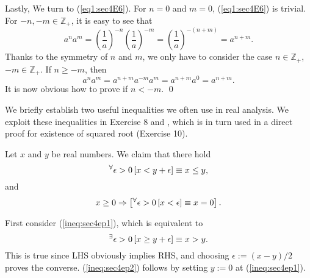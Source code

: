 \documentclass[a4paper,12pt]{article}
\begin{document}
\begin{sol}
	Lastly, We turn to (\ref{eq1:sec4E6}).
	For
	\( n=0 \)
	and
	\( m=0 \),
	(\ref{eq1:sec4E6})
	is trivial.
	For
	\( -n, -m \in \mathbb{Z}_{+} \),
	it is easy to see that
	\begin{equation*}
		a^n a^m
		=
		\left( \frac{1}{a} \right)^{-n} \left( \frac{1}{a} \right)^{-m}
		=
		\left( \frac{1}{a} \right)^{-(n+m)}
		=
		a^{n+m}.
	\end{equation*}
	Thanks to the symmetry of 
	\( n \)
	and
	\( m \),
	we only have to consider the case
	\( n \in \mathbb{Z}_{+} \),
	\( -m \in \mathbb{Z}_{+} \).
	If 
	\( n\ge -m \),
	then
	\begin{equation*}
		a^n a^m
		=
		a^{n+m}a^{-m}a^{m}
		=
		a^{n+m}a^{0}
		=
		a^{n+m}.
	\end{equation*}
	It is now obvious how to prove if
	\( n < -m \).
	\qed\end{sol}

We briefly establish two useful inequalities we often use in real analysis.
We exploit these inequalities in Exercise 8 and
,
which is in turn used in a direct proof for existence of squared root (Exercise 10).
\begin{lem}\label{lem:ineq_epsilon}
	Let \( x \) and \( y \) be real numbers.
	We claim that there hold
	\begin{equation}\label{ineq:sec4ep1}
		{}^{\forall}  \epsilon >0\left[ x< y+ \epsilon \right]
		\equiv
		x \le y,
	\end{equation}
	and 
	\begin{equation}\label{ineq:sec4ep2}
		x \ge 0
		\Rightarrow
		\left[
			{}^{\forall}  \epsilon >0\left[ x <\epsilon \right]
			\equiv
			x=0
			\right].
	\end{equation}
\end{lem}
\begin{prf}
	First consider (\ref{ineq:sec4ep1}),
	which is equivalent to
	\begin{equation*}
		{}^{\exists} \epsilon >0\left[ x\ge y+ \epsilon \right]
		\equiv
		x > y.
	\end{equation*}
	This is true since LHS obviously implies RHS, and choosing \( \epsilon:=(x-y)/2 \) proves the converse.
	(\ref{ineq:sec4ep2}) follows by setting \( y:=0 \) at (\ref{ineq:sec4ep1}).
\end{prf}
\end{document}
